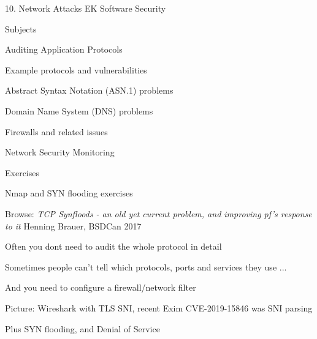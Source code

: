 \documentclass[Screen16to9,17pt]{foils}
\begin{document}
\mytitlepage
{10. Network Attacks}
{EK  Software Security}


\begin{list1}
\item Subjects
\begin{list2}
\item Auditing Application Protocols
\item Example protocols and vulnerabilities
\item Abstract Syntax Notation (ASN.1) problems
\item Domain Name System (DNS) problems
\item Firewalls and related issues
\item Network Security Monitoring
\end{list2}
\item Exercises
\begin{list2}
\item Nmap and SYN flooding exercises
\end{list2}
\end{list1}


\begin{list1}
\item Browse: \emph{TCP Synfloods - an old yet current problem, and improving pf's response to it}
Henning Brauer, BSDCan 2017 
\end{list1}





\begin{list1}
\item Often you dont need to audit the whole protocol in detail
\item Sometimes people can't tell which protocols, ports and services they use ...
\item And you need to configure a firewall/network filter
\item Picture: Wireshark with TLS SNI, recent Exim CVE-2019-15846 was SNI parsing
\item Plus SYN flooding, and Denial of Service
\end{list1}
\end{document}
